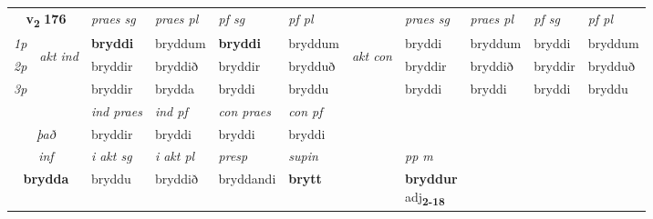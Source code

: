 \noindent
\begin{tabular}{lllllllllll} \toprule
\multicolumn{2}{c}{\textbf{v{\textsubscript{2}}} \Large{\textbf{176}}}  &  \textit{praes sg}  & \textit{praes pl}  &\textit{ pf sg} & \textit{pf pl} &  &  \textit{praes sg}  & \textit{praes pl}  & \textit{pf sg} & \textit{pf pl } \\*
	\cmidrule{3-6} \cmidrule{8-11}
 {\textit{1p}} & \multirow{3}{*}{\begin{turn}{90}\textit{akt ind}\end{turn}} & \textbf{bryddi} & bryddum & \textbf{bryddi} & bryddum & \multirow{3}{*}{\begin{turn}{90}\textit{akt con}\end{turn}} &bryddi & bryddum & bryddi & bryddum\\*
 {\textit{2p}} &  &  bryddir  & bryddið & bryddir & brydduð & & bryddir & bryddið & bryddir & brydduð \\*
{\textit{3p}} &  & bryddir & brydda & bryddi & bryddu & & bryddi & bryddi& bryddi & bryddu \\*
\cmidrule{3-6} \cmidrule{8-11}

   & &  \textit{ind praes} & \textit{ind pf} & \textit{con praes} & \textit{con pf} \\*
\multicolumn{2}{c}{ \textit{það} } & bryddir & bryddi & bryddi & bryddi \\*

\cmidrule{3-8}
   \multicolumn{2}{c}{\textit{inf}}  & \textit{i akt sg} & \textit{i akt pl}   & \textit{presp} & \textit{supin}  && \textit{pp m} \\*
  \multicolumn{2}{c}{\textbf{brydda}} & bryddu  & bryddið   & bryddandi &  \textbf{brytt}  && \specialcell{\textbf{bryddur} \\ adj\textbf{\textsubscript{2-18}}} \\*
\end{tabular}

